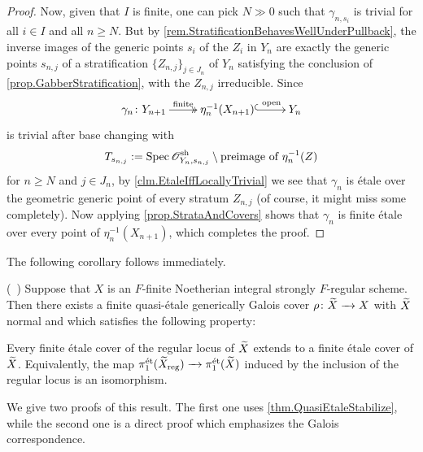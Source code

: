 \documentclass[12pt]{amsart}
\numberwithin{equation}{theorem}
\renewcommand{\:}{\colon}
\newcommand{\piet}{\pi_1^{\textnormal{\'{e}t}}} %
\theoremstyle{theorem}
\renewcommand{\O}{\mathscr O}
\begin{document}
\begin{proof}
Now, given that $I$ is finite, one can pick $N \gg 0$ such that $\gamma_{n, s_i}$ is trivial for all $i \in I$ and all $n \geq N$. %
But by \autoref{rem.StratificationBehavesWellUnderPullback}, the inverse images of the generic points $s_i$ of the $Z_i$ in $Y_n$ are exactly the generic points $s_{n,j}$ of a stratification $\{ Z_{n,j} \}_{j \in J_n}$ of $Y_n$ satisfying the conclusion of \autoref{prop.GabberStratification}, with the $Z_{n,j}$ irreducible. Since
\[
\xymatrix{
\gamma_n\colon Y_{n+1} \ar@{->>}[r]^-{\text{finite}} & \eta_{n}^{-1}(X_{n+1}) \ar@{^{(}->}[r]^-{\text{open}} & Y_{n}
}
\]
is trivial after base changing with
\[ T_{s_{n,j}} := \Spec \O_{Y_n, s_{n,j}}^{\sh} \setminus \text{preimage of $\eta_n^{-1}(Z)$} \]
for $n \ge N$ and $j \in J_n$, by \autoref{clm.EtaleIffLocallyTrivial} we see that $\gamma_n$ is \'etale over the geometric generic point of every stratum $Z_{n,j}$ (of course, it might miss some completely).
Now applying \autoref{prop.StrataAndCovers} shows that $\gamma_n$ is finite \'etale over every point of $\eta_n^{-1}(X_{n+1})$, which completes the proof.
\end{proof}

The following corollary follows immediately.

\begin{corollary}\textnormal{(\cf~\cite[Theorem 1.5]{GrebKebekusPeternellEtaleFundamental})} \label{cor.MaximalQuasiEtale}
Suppose that $X$ is an $F$-finite Noetherian integral strongly $F$-regular scheme.
Then there exists a finite quasi-\'etale generically Galois cover $\rho\colon \widetilde X \xrightarrow{\ \ } X$ with $\widetilde X$ normal and which satisfies the following property:

Every finite \'etale cover of the regular locus of $\widetilde X$ extends to a finite \'etale cover of $\widetilde X$.
Equivalently, the map $\piet(\tld X_{\reg}) \to \piet(\tld X)$ induced by the inclusion of the regular locus is an isomorphism.
\end{corollary}

We give two proofs of this result.
The first one uses \autoref{thm.QuasiEtaleStabilize}, while the second one is a direct proof which emphasizes the Galois correspondence.
\end{document}
